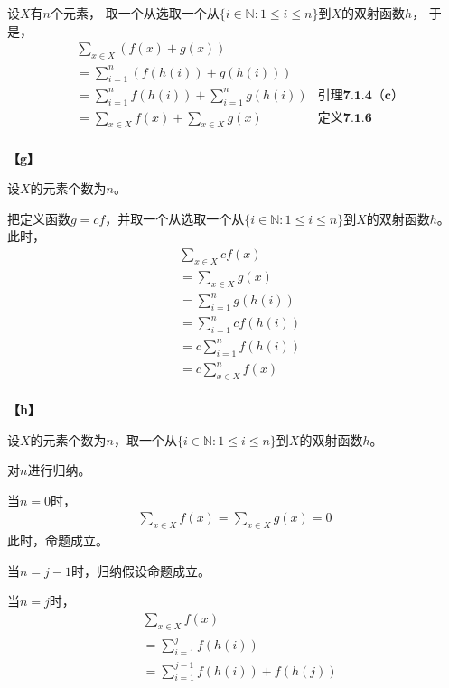 \documentclass{article}
\theoremstyle{mystyle}
\begin{document}
设$X$有$n$个元素，
取一个从选取一个从$\{i \in \mathbb{N}: 1 \leq i \leq n\}$到$X$的双射函数$h$，
于是，
\begin{align*}
       & \sum \limits_{x \in X} (f(x) + g(x))                                                \\
       & = \sum \limits_{i=1}^n (f(h(i)) + g(h(i)))                                          \\
       & = \sum \limits_{i=1}^n f(h(i)) + \sum \limits_{i=1}^n g(h(i)) & \textbf{引理7.1.4（c）} \\
       & = \sum \limits_{x \in X} f(x) +\sum \limits_{x \in X} g(x)    & \textbf{定义7.1.6}    \\
\end{align*}

\textbf{【g】}

设$X$的元素个数为$n$。

把定义函数$g = cf$，并取一个从选取一个从$\{i \in \mathbb{N}: 1 \leq i \leq n\}$到$X$的双射函数$h$。
此时，
\begin{align*}
       & \sum \limits_{x \in X} cf(x)       \\
       & = \sum \limits_{x \in X} g(x)      \\
       & = \sum \limits_{i = 1}^n g(h(i))   \\
       & = \sum \limits_{i = 1}^n cf(h(i))  \\
       & = c \sum \limits_{i = 1}^n f(h(i)) \\
       & = c \sum \limits_{x \in X}^n f(x)  \\
\end{align*}

\textbf{【h】}

设$X$的元素个数为$n$，取一个从$\{i \in \mathbb{N}: 1 \leq i \leq n\}$到$X$的双射函数$h$。

对$n$进行归纳。

当$n = 0$时，
\begin{align*}
      \sum \limits_{x \in X} f(x) = \sum \limits_{x \in X} g(x) = 0
\end{align*}
此时，命题成立。

当$n=j-1$时，归纳假设命题成立。

当$n=j$时，
\begin{align*}
       & \sum \limits_{x \in X} f(x)                    \\
       & = \sum \limits_{i = 1}^j f(h(i))               \\
       & = \sum \limits_{i = 1}^{j-1} f(h(i)) + f(h(j)) \\
\end{align*}
\end{document}
